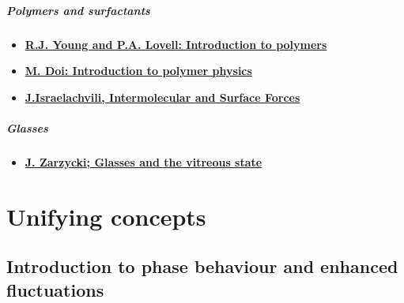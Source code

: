 \documentclass[
  letterpaper,
  DIV=11,
  numbers=noendperiod]{scrreprt}
\providecommand{\tightlist}{%
  \setlength{\itemsep}{0pt}\setlength{\parskip}{0pt}}\usepackage{longtable,booktabs,array}
\begin{document}
\subsubsection*{Polymers and
surfactants}\label{polymers-and-surfactants}

\begin{itemize}
\item
  \textbf{\href{https://bris.on.worldcat.org/search/detail/744914764?queryString=introduction\%20to\%20polymers&clusterResults=true&stickyFacetsChecked=true&groupVariantRecords=false&newsArticles=off&bookReviews=off}{R.J.
  Young and P.A. Lovell: Introduction to polymers}}
\item
  \textbf{\href{https://bris.on.worldcat.org/search/detail/32465842?queryString=introduction\%20to\%20polymer\%20physics&clusterResults=true&stickyFacetsChecked=true&groupVariantRecords=false&newsArticles=off&bookReviews=off}{M.
  Doi: Introduction to polymer physics}}
\item
  \textbf{\href{https://bris.on.worldcat.org/search/detail/961357167?queryString=\%20Intermolecular\%20and\%20Surface\%20Forces&clusterResults=true&stickyFacetsChecked=true&groupVariantRecords=false&newsArticles=off&bookReviews=off}{J.Israelachvili,
  Intermolecular and Surface Forces}}
\end{itemize}

\subsubsection*{Glasses}\label{glasses}

\begin{itemize}
\tightlist
\item
  \textbf{\href{https://bris.on.worldcat.org/search/detail/21975348?queryString=Glasses\%20and\%20the\%20vitreous\%20state&clusterResults=true&stickyFacetsChecked=true&groupVariantRecords=false&newsArticles=off&bookReviews=off}{J.
  Zarzycki; Glasses and the vitreous state}}
\end{itemize}

\part{Unifying concepts}

\chapter{Introduction to phase behaviour and enhanced
fluctuations}\label{introduction-to-phase-behaviour-and-enhanced-fluctuations}
\end{document}
